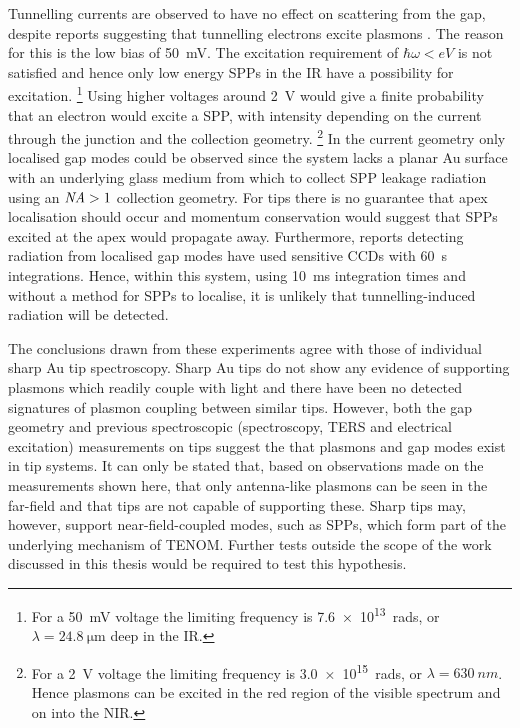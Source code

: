 \documentclass[a4paper]{article}
\begin{document}
Tunnelling currents are observed to have no effect on scattering from the gap, despite reports suggesting that tunnelling electrons excite plasmons \cite{lambe1976, berndt1991, bharadwaj2011, wang2011, divitt2013, ye2014}. The reason for this is the low bias of \SI{50}{mV}. The excitation requirement of $\hbar\omega<eV$ is not satisfied and hence only low energy SPPs in the IR have a possibility for excitation.%
\footnote{For a \SI{50}{mV} voltage the limiting frequency is \SI{7.6e13}{rads}, or $\lambda=\SI{24.8}{\micro\metre}$ deep in the IR.}
Using higher voltages around \SI{2}{V} would give a finite probability that an electron would excite a SPP, with intensity depending on the current through the junction and the collection geometry.%
\footnote{For a \SI{2}{V} voltage the limiting frequency is \SI{3.0e15}{rads}, or $\lambda=\SI{630}{nm}$. Hence plasmons can be excited in the red region of the visible spectrum and on into the NIR.}
In the current geometry only localised gap modes could be observed since the system lacks a planar Au surface with an underlying glass medium from which to collect SPP leakage radiation using an $\mathit{NA}>1$ collection geometry. For tips there is no guarantee that apex localisation should occur and momentum conservation would suggest that SPPs excited at the apex would propagate away. Furthermore, reports detecting radiation from localised gap modes have used sensitive CCDs with \SI{60}{s} integrations. Hence, within this system, using \SI{10}{ms} integration times and without a method for SPPs to localise, it is unlikely that tunnelling-induced radiation will be detected.

The conclusions drawn from these experiments agree with those of individual sharp Au tip spectroscopy. Sharp Au tips do not show any evidence of supporting plasmons which readily couple with light and there have been no detected signatures of plasmon coupling between similar tips. However, both the gap geometry and previous spectroscopic (spectroscopy, TERS and electrical excitation) measurements on tips suggest the that plasmons and gap modes exist in tip systems. It can only be stated that, based on observations made on the measurements shown here, that only antenna-like plasmons can be seen in the far-field and that tips are not capable of supporting these. Sharp tips may, however, support near-field-coupled modes, such as SPPs, which form part of the underlying mechanism of TENOM. Further tests outside the scope of the work discussed in this thesis would be required to test this hypothesis.
\end{document}
